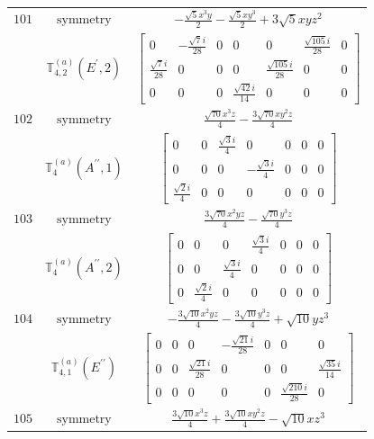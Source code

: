\documentclass[fleqn,8pt,landscape]{jsarticle}
\begin{document}
\begin{longtable}{ccc}
$ 101 $ & $ \text{symmetry} $ & $ - \frac{\sqrt{5} x^{3} y}{2} - \frac{\sqrt{5} x y^{3}}{2} + 3 \sqrt{5} x y z^{2} $ \\
$  $ & $ \mathbb{T}_{4,2}^{(a)}(E^{\prime},2) $ & $ \begin{bmatrix} 0 & - \frac{\sqrt{7} i}{28} & 0 & 0 & 0 & \frac{\sqrt{105} i}{28} & 0 \\ \frac{\sqrt{7} i}{28} & 0 & 0 & 0 & \frac{\sqrt{105} i}{28} & 0 & 0 \\ 0 & 0 & 0 & \frac{\sqrt{42} i}{14} & 0 & 0 & 0 \end{bmatrix} $ \\ \hline
$ 102 $ & $ \text{symmetry} $ & $ \frac{\sqrt{70} x^{3} z}{4} - \frac{3 \sqrt{70} x y^{2} z}{4} $ \\
$  $ & $ \mathbb{T}_{4}^{(a)}(A^{\prime\prime},1) $ & $ \begin{bmatrix} 0 & 0 & \frac{\sqrt{3} i}{4} & 0 & 0 & 0 & 0 \\ 0 & 0 & 0 & - \frac{\sqrt{3} i}{4} & 0 & 0 & 0 \\ \frac{\sqrt{2} i}{4} & 0 & 0 & 0 & 0 & 0 & 0 \end{bmatrix} $ \\ \hline
$ 103 $ & $ \text{symmetry} $ & $ \frac{3 \sqrt{70} x^{2} y z}{4} - \frac{\sqrt{70} y^{3} z}{4} $ \\
$  $ & $ \mathbb{T}_{4}^{(a)}(A^{\prime\prime},2) $ & $ \begin{bmatrix} 0 & 0 & 0 & \frac{\sqrt{3} i}{4} & 0 & 0 & 0 \\ 0 & 0 & \frac{\sqrt{3} i}{4} & 0 & 0 & 0 & 0 \\ 0 & \frac{\sqrt{2} i}{4} & 0 & 0 & 0 & 0 & 0 \end{bmatrix} $ \\ \hline
$ 104 $ & $ \text{symmetry} $ & $ - \frac{3 \sqrt{10} x^{2} y z}{4} - \frac{3 \sqrt{10} y^{3} z}{4} + \sqrt{10} y z^{3} $ \\
$  $ & $ \mathbb{T}_{4,1}^{(a)}(E^{\prime\prime}) $ & $ \begin{bmatrix} 0 & 0 & 0 & - \frac{\sqrt{21} i}{28} & 0 & 0 & 0 \\ 0 & 0 & \frac{\sqrt{21} i}{28} & 0 & 0 & 0 & \frac{\sqrt{35} i}{14} \\ 0 & 0 & 0 & 0 & 0 & \frac{\sqrt{210} i}{28} & 0 \end{bmatrix} $ \\ \hline
$ 105 $ & $ \text{symmetry} $ & $ \frac{3 \sqrt{10} x^{3} z}{4} + \frac{3 \sqrt{10} x y^{2} z}{4} - \sqrt{10} x z^{3} $ \\

\end{longtable}
\end{document}
